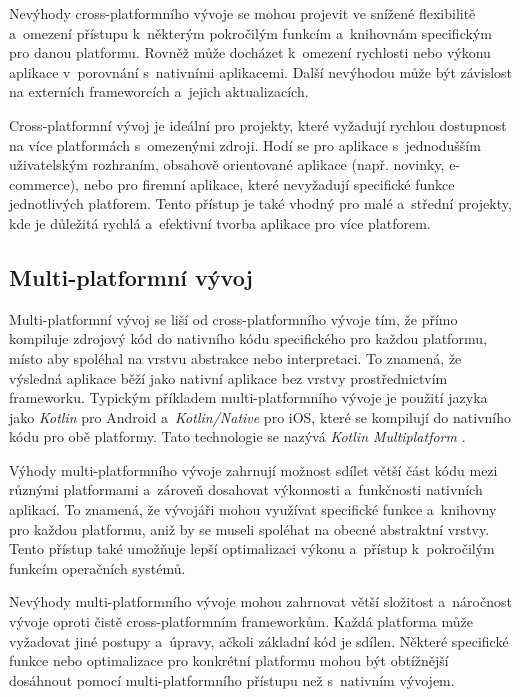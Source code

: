 Nevýhody cross-platformního vývoje se mohou projevit ve snížené flexibilitě a~omezení přístupu k~některým pokročilým funkcím a~knihovnám specifickým pro danou platformu. Rovněž může docházet k~omezení rychlosti nebo výkonu aplikace v~porovnání s~nativními aplikacemi. Další nevýhodou může být závislost na externích frameworcích a~jejich aktualizacích.

Cross-platformní vývoj je ideální pro projekty, které vyžadují rychlou dostupnost na více platformách s~omezenými zdroji. Hodí se pro aplikace s~jednodušším uživatelským rozhraním, obsahově orientované aplikace (např. novinky, e-commerce), nebo pro firemní aplikace, které nevyžadují specifické funkce jednotlivých platforem. Tento přístup je také vhodný pro malé a~střední projekty, kde je důležitá rychlá a~efektivní tvorba aplikace pro více platforem.

\subsection{Multi-platformní vývoj}

Multi-platformní vývoj se liší od cross-platformního vývoje tím, že přímo kompiluje zdrojový kód do nativního kódu specifického pro každou platformu, místo aby spoléhal na vrstvu abstrakce nebo interpretaci. To znamená, že výsledná aplikace běží jako nativní aplikace bez vrstvy prostřednictvím frameworku. Typickým příkladem multi-platformního vývoje je použití jazyka jako \emph{Kotlin} pro Android a~\emph{Kotlin/Native} pro iOS, které se kompilují do nativního kódu pro obě platformy. Tato technologie se nazývá \emph{Kotlin Multiplatform} \cite{kotlin-multiplatform}.

Výhody multi-platformního vývoje zahrnují možnost sdílet větší část kódu mezi různými platformami a~zároveň dosahovat výkonnosti a~funkčnosti nativních aplikací. To znamená, že vývojáři mohou využívat specifické funkce a~knihovny pro každou platformu, aniž by se museli spoléhat na obecné abstraktní vrstvy. Tento přístup také umožňuje lepší optimalizaci výkonu a~přístup k~pokročilým funkcím operačních systémů.

Nevýhody multi-platformního vývoje mohou zahrnovat větší složitost a~náročnost vývoje oproti čistě cross-platformním frameworkům. Každá platforma může vyžadovat jiné postupy a~úpravy, ačkoli základní kód je sdílen. Některé specifické funkce nebo optimalizace pro konkrétní platformu mohou být obtížnější dosáhnout pomocí multi-platformního přístupu než s~nativním vývojem.

